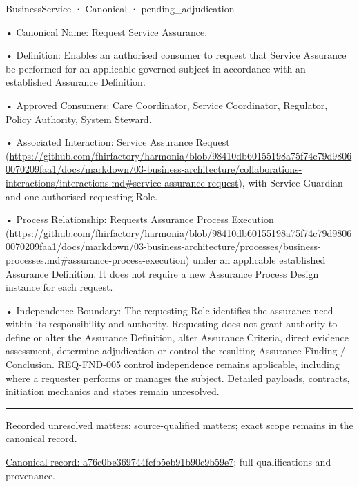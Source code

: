 \label{element:a76c0be369744fcfb5eb91b90c9b59e7}
{\small BusinessService · Canonical · pending\_adjudication}\par

•
Canonical Name: Request Service Assurance.



•
Definition: Enables an authorised consumer to request that Service Assurance be performed for an applicable governed subject in accordance with an established Assurance Definition.



•
Approved Consumers: Care Coordinator, Service Coordinator, Regulator, Policy Authority, System Steward.



•
Associated Interaction: Service Assurance Request (\url{https://github.com/fhirfactory/harmonia/blob/98410db60155198a75f74c79d98060070209faa1/docs/markdown/03-business-architecture/collaborations-interactions/interactions.md#service-assurance-request}), with Service Guardian and one authorised requesting Role.



•
Process Relationship: Requests Assurance Process Execution (\url{https://github.com/fhirfactory/harmonia/blob/98410db60155198a75f74c79d98060070209faa1/docs/markdown/03-business-architecture/processes/business-processes.md#assurance-process-execution}) under an applicable established Assurance Definition. It does not require a new Assurance Process Design instance for each request.



•
Independence Boundary: The requesting Role identifies the assurance need within its responsibility and authority. Requesting does not grant authority to define or alter the Assurance Definition, alter Assurance Criteria, direct evidence assessment, determine adjudication or control the resulting Assurance Finding / Conclusion. REQ-FND-005 control independence remains applicable, including where a requester performs or manages the subject. Detailed payloads, contracts, initiation mechanics and states remain unresolved.



\medskip\hrule\medskip

{\small Recorded unresolved matters: source-qualified matters; exact scope remains in the canonical record.}\par
{\footnotesize \href{../../../../../../../../continuum/business/business-service/a76c0be369744fcfb5eb91b90c9b59e7.md}{Canonical record: a76c0be369744fcfb5eb91b90c9b59e7}; full qualifications and provenance.}\par
